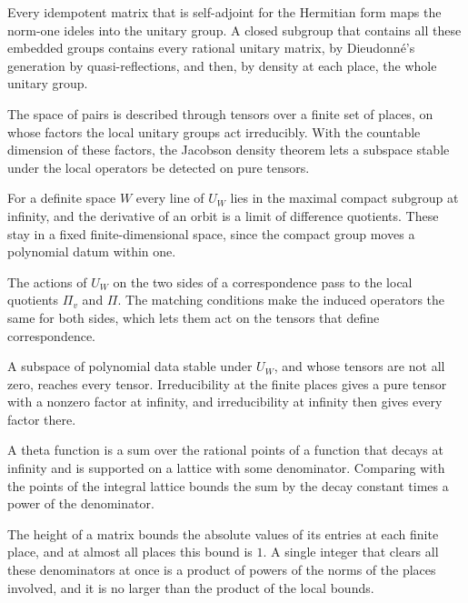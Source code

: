 Every idempotent matrix that is self-adjoint for the Hermitian form maps the
norm-one ideles into the unitary group. A closed subgroup that contains
all these embedded groups contains every rational unitary matrix, by
Dieudonné's generation by quasi-reflections, and then, by density at each
place, the whole unitary group.

The space of pairs is described through tensors over a finite set of places,
on whose factors the local unitary groups act irreducibly. With the countable
dimension of these factors, the Jacobson density theorem lets a subspace stable
under the local operators be detected on pure tensors.

For a definite space $W$ every line of $U_W$ lies in the maximal compact
subgroup at infinity, and the derivative of an orbit is a limit of difference
quotients. These stay in a fixed finite-dimensional space, since the compact
group moves a polynomial datum within one.

The actions of $U_W$ on the two sides of a correspondence pass to the local
quotients $\Pi_v$ and $\Pi$. The matching conditions make the induced operators
the same for both sides, which lets them act on the tensors that define
correspondence.

A subspace of polynomial data stable under $U_W$, and whose tensors are not all
zero, reaches every tensor. Irreducibility at the finite places gives a pure
tensor with a nonzero factor at infinity, and irreducibility at infinity then
gives every factor there.

A theta function is a sum over the rational points of a function that decays
at infinity and is supported on a lattice with some denominator. Comparing with
the points of the integral lattice bounds the sum by the decay constant times a
power of the denominator.

The height of a matrix bounds the absolute values of its entries at each
finite place, and at almost all places this bound is $1$. A single integer
that clears all these denominators at once is a product of powers of the norms
of the places involved, and it is no larger than the product of the local
bounds.

